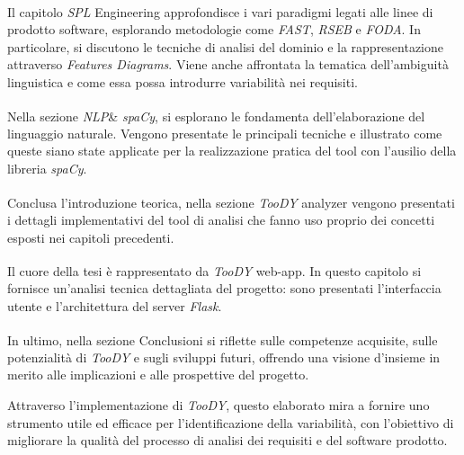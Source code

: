 \documentclass[12pt]{report}
\newcommand{\torevise}[1]{\textcolor{red}{#1}}
\newcommand{\myref}[1]{\textsuperscript{\hyperref[#1]{\ding{70}}}}
\newcommand{\toody}{\textsl{TooDY}\xspace}
\newcommand{\flask}{\textsl{Flask}\xspace}
\newcommand{\spacy}{\textsl{spaCy}\xspace}
\newcommand{\spl}{\textsl{SPL}\xspace}
\newcommand{\nlp}{\textsl{NLP}\xspace}
\begin{document}
\begin{mdframed}
\small
Il capitolo \textsf{\spl Engineering}\myref{ch:sple} approfondisce i vari paradigmi legati alle linee di prodotto software, esplorando metodologie come \textit{FAST}, \textit{RSEB} e \textit{FODA}. In particolare, si discutono le tecniche di analisi del dominio e la rappresentazione attraverso \textit{Features Diagrams}. Viene anche affrontata la tematica dell’ambiguità linguistica e come essa possa introdurre variabilità nei requisiti.

\vspace{0.25cm}

Nella sezione \textsf{\nlp \& \spacy}\myref{ch:nlp}, si esplorano le fondamenta dell'elaborazione del linguaggio naturale. Vengono presentate le principali tecniche e illustrato come queste siano state applicate per la realizzazione pratica del tool con l'ausilio della libreria \spacy.

\vspace{0.25cm}

Conclusa l'introduzione teorica, nella sezione \textsf{\toody analyzer}\myref{ch:parser} vengono presentati i dettagli implementativi del tool di analisi che fanno uso proprio dei concetti esposti nei capitoli precedenti.

\vspace{0.25cm}

Il cuore della tesi è rappresentato da \textsf{\toody web-app}\myref{ch:architettura}. In questo capitolo si fornisce un'analisi tecnica dettagliata del progetto: sono presentati l’interfaccia utente e l'architettura del server \flask.

\vspace{0.25cm}

In ultimo, nella sezione \textsf{Conclusioni}\myref{ch:conclusioni} si riflette sulle competenze acquisite, sulle potenzialità di \toody e sugli sviluppi futuri, offrendo una visione d'insieme in merito alle implicazioni e alle prospettive del progetto.
\end{mdframed}


\noindent Attraverso l’implementazione di \toody, questo elaborato mira a fornire uno strumento utile ed efficace per l’identificazione della variabilità, con l’obiettivo di migliorare la qualità del processo di analisi dei requisiti e del software prodotto.
\end{document}
